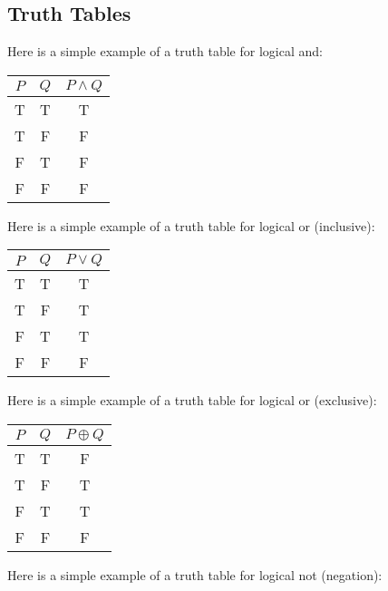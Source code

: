 \documentclass{report}
\begin{document}
    \pagebreak \bigbreak \noindent 
    \subsection{Truth Tables}
    \bigbreak \noindent 
        Here is a simple example of a truth table for logical and:
    \bigbreak \noindent 
    \begin{center}
        \begin{tabular}{|c|c|c|}
            \hline
            $P$ & $Q$ & $P \land Q$ \\
            \hline
            T & T & T \\
            T & F & F \\
            F & T & F \\
            F & F & F \\
            \hline
        \end{tabular}
    \end{center}
    \bigbreak \noindent 
    Here is a simple example of a truth table for logical or (inclusive):
    \bigbreak \noindent 
    \begin{center}
        \begin{tabular}{|c|c|c|}
            \hline
            $P$ & $Q$ & $P \lor Q$ \\
            \hline
            T & T & T \\
            T & F & T \\
            F & T & T \\
            F & F & F \\
            \hline
        \end{tabular}
    \end{center}
    \bigbreak \noindent 
    Here is a simple example of a truth table for logical or (exclusive):
    \bigbreak \noindent 
    \begin{center}
        \begin{tabular}{|c|c|c|}
            \hline
            $P$ & $Q$ & $P \oplus Q$ \\
            \hline
            T & T & F \\
            T & F & T \\
            F & T & T \\
            F & F & F \\
            \hline
        \end{tabular}
    \end{center}
    \bigbreak \noindent 
    Here is a simple example of a truth table for logical not (negation):
\end{document}
